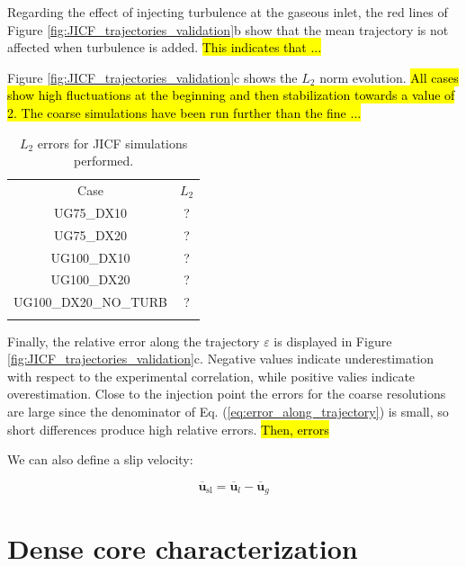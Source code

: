 Regarding the effect of injecting turbulence at the gaseous inlet, the red lines of Figure \ref{fig:JICF_trajectories_validation}b show that the mean trajectory is not affected when turbulence is added. \hl{This indicates that ...}

Figure \ref{fig:JICF_trajectories_validation}c shows the $L_2$ norm evolution. \hl{All cases show high fluctuations at the beginning and then stabilization towards a value of 2. The coarse simulations have been run further than the fine ...}

\begin{table}[!h]
\centering
\caption{$L_2$ errors for JICF simulations performed.}
\begin{tabular}{cc}
\thickhline
Case &  $L_2$ \\
\thickhline 
UG75\_DX10 & ? \\
UG75\_DX20 & ?  \\
UG100\_DX10 & ? \\
UG100\_DX20 & ?  \\
UG100\_DX20\_NO\_TURB & ? \\
\thickhline
\end{tabular}
\label{tab:jicf_L2_errors}
\end{table}



Finally, the relative error along the trajectory $\varepsilon$ is displayed in Figure \ref{fig:JICF_trajectories_validation}c. Negative values indicate underestimation with respect to the experimental correlation, while positive valies indicate overestimation. Close to the injection point the errors for the coarse resolutions are large since the denominator of Eq. (\ref{eq:error_along_trajectory}) is small, so short differences produce high relative errors. \hl{Then, errors }

We can also define a slip velocity:

\begin{equation}
\overline{\textbf{u}}_{\mathrm{sl}} = \overline{\textbf{u}}_l - \overline{\textbf{u}}_g
\end{equation}

\clearpage

\section{Dense core characterization}
\label{subsec:ch5_dense_core_in_ACLS_simus}



